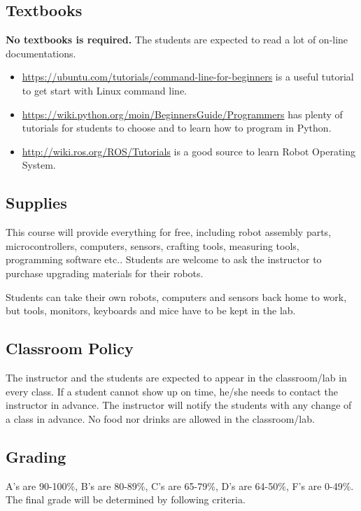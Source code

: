 \documentclass[11pt,letterpaper]{article}
\begin{document}
\subsection*{Textbooks}
\textbf{No textbooks is required.} The students are expected to read a lot of on-line documentations.
\begin{itemize}
    \item \href{https://ubuntu.com/tutorials/command-line-for-beginners#1-overview}{https://ubuntu.com/tutorials/command-line-for-beginners} is a useful tutorial to get start with Linux command line.
    \item \href{https://wiki.python.org/moin/BeginnersGuide/Programmers}{https://wiki.python.org/moin/BeginnersGuide/Programmers} has plenty of tutorials for students to choose and to learn how to program in Python.
    \item \href{http://wiki.ros.org/ROS/Tutorials}{http://wiki.ros.org/ROS/Tutorials} is a good source to learn Robot Operating System.
\end{itemize}

\subsection*{Supplies}
This course will provide everything for free, including robot assembly parts, microcontrollers, computers, sensors, crafting tools, measuring tools, programming software etc.. Students are welcome to ask the instructor to purchase upgrading materials for their robots.

Students can take their own robots, computers and sensors back home to work, but tools, monitors, keyboards and mice have to be kept in the lab. 

\subsection*{Classroom Policy}
The instructor and the students are expected to appear in the classroom/lab in every class. If a student cannot show up on time, he/she needs to contact the instructor in advance. The instructor will notify the students with any change of a class in advance. No food nor drinks are allowed in the classroom/lab.

\subsection*{Grading}
A’s are 90-100\%, B’s are 80-89\%, C’s are 65-79\%, D's are 64-50\%, F's are 0-49\%. The final grade will be determined by following criteria.
\end{document}
